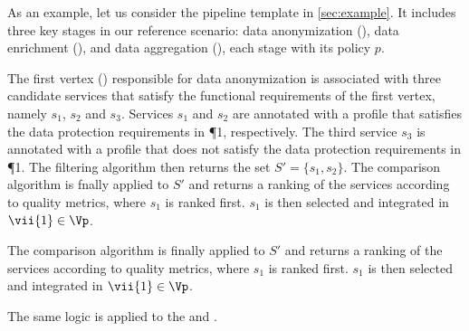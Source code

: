 
\begin{example}\label{ex:instance}

  As an example, let us consider the pipeline template \tChartFunction in \cref{sec:example}.
  It includes three key stages in our reference scenario: data anonymization (), data enrichment (), and data aggregation (), each stage with its policy $p$.

  The first vertex () responsible for data anonymization is associated with three candidate services that satisfy the functional requirements of the first vertex, namely $s_1$, $s_2$ and $s_3$.
  Services $s_1$ and $s_2$ are annotated with a profile that satisfies the data protection requirements in \P{1}, respectively.
  The third service $s_3$ is annotated with a profile that does not satisfy the data protection requirements in \P{1}.
  The filtering algorithm then returns the set $S'=\{s_1,s_2\}$.
  The comparison algorithm is fnally applied to $S'$ and returns a ranking of the services according to quality metrics, where $s_1$ is ranked first. $s_1$ is then selected and integrated in $\vii{1}\in \Vp$.

  The comparison algorithm is finally applied to $S'$ and returns a ranking of the services according to quality metrics, where $s_1$ is ranked first. $s_1$ is then selected and integrated in $\vii{1}\in \Vp$.

  The same logic is applied to the  and .

\end{example}







